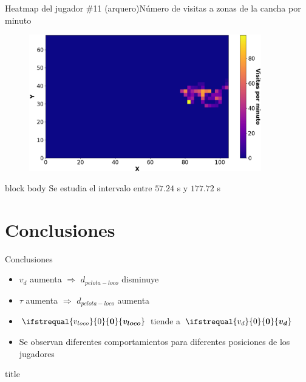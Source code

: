 \documentclass{beamer}
\renewcommand\vec[1]{\ifstrequal{#1}{0}{\ensuremath{\mathbf{0}}}{\ensuremath{\boldsymbol{#1}}}}
\begin{document}
            \begin{frame}{Heatmap del jugador \#11 (arquero)}{Número de visitas a zonas de la cancha por minuto}
                \begin{figure}[H!]
                    \includegraphics[width=0.9\textwidth]{./heatmap_jugador_11}
                    \label{fig:futbol_15}
                \end{figure}
                \begin{beamercolorbox}[sep=5pt,center]{block body}
                    \centering
                    \small{Se estudia el intervalo entre $57.24$ s y $177.72$ s}
                \end{beamercolorbox}
            \end{frame}

    \section{Conclusiones}

        \begin{frame}{Conclusiones}
            \begin{itemize}
                \item $v_d$ aumenta $\Rightarrow$ $d_{pelota-loco}$ disminuye
                \item $\tau$ aumenta $\Rightarrow$ $d_{pelota-loco}$ aumenta
                \item $\vec{v_{loco}}$ tiende a $\vec{v_d}$
                \item Se observan diferentes comportamientos para diferentes posiciones de los jugadores
            \end{itemize}
        \end{frame}

        \begin{frame}
            \begin{beamercolorbox}[sep=8pt,center]{title}
            \end{beamercolorbox}
        \end{frame}
\end{document}
